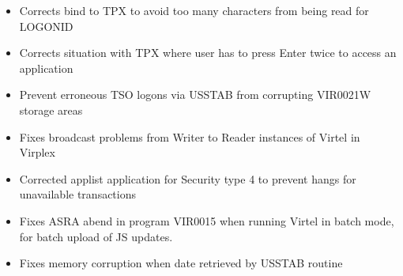 \documentclass[letterpaper,10pt,english]{sphinxmanual}
\begin{document}
\begin{itemize}
\item {} 
Corrects bind to TPX to avoid too many characters from being read for LOGONID

\end{itemize}

\begin{itemize}
\item {} 
Corrects situation with TPX where user has to press Enter twice to access an application

\end{itemize}

\begin{itemize}
\item {} 
Prevent erroneous TSO logons via USSTAB from corrupting VIR0021W storage areas

\end{itemize}

\begin{itemize}
\item {} 
Fixes broadcast problems from Writer to Reader instances of Virtel in Virplex

\end{itemize}

\begin{itemize}
\item {} 
Corrected applist application for Security type 4 to prevent hangs for unavailable transactions

\end{itemize}

\begin{itemize}
\item {} 
Fixes ASRA abend in program VIR0015 when running Virtel in batch mode, for batch upload of JS updates.

\end{itemize}

\begin{itemize}
\item {} 
Fixes memory corruption when date retrieved by USSTAB routine

\end{itemize}
\end{document}
